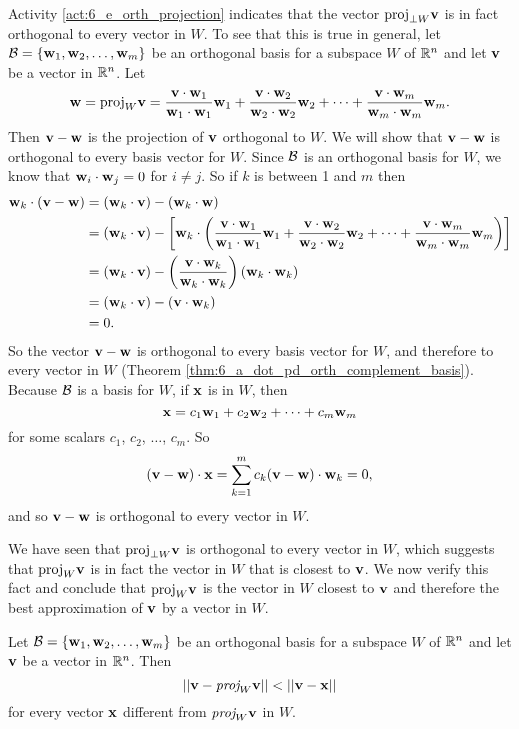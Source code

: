 Activity \ref{act:6_e_orth_projection} indicates that the vector $\text{proj}_{\perp W} \mathbf{v}$ is in fact orthogonal to every vector in $W$. To see that this is true in general, let $\mathcal{B} = \{\mathbf{w}_1, \mathbf{w}_2, \ldots, \mathbf{w}_m\}$ be an orthogonal basis for a subspace $W$ of $\mathbb{R}^n$ and let $\mathbf{v}$ be a vector in $\mathbb{R}^n$. Let 
\[\mathbf{w} =  \text{proj}_W \mathbf{v} = \frac{\mathbf{v} \cdot \mathbf{w}_1}{\mathbf{w}_1 \cdot \mathbf{w}_1} \mathbf{w}_1 + \frac{\mathbf{v} \cdot \mathbf{w}_2}{\mathbf{w}_2 \cdot \mathbf{w}_2}  \mathbf{w}_2 + \cdots + \frac{\mathbf{v} \cdot \mathbf{w}_m}{\mathbf{w}_m \cdot \mathbf{w}_m}  \mathbf{w}_m.\]
Then $\mathbf{v} - \mathbf{w}$ is the projection of $\mathbf{v}$ orthogonal to $W$. We will show that $\mathbf{v} - \mathbf{w}$ is orthogonal to every basis vector for $W$. Since $\mathcal{B}$ is an orthogonal basis for $W$, we know that $\mathbf{w}_i \cdot \mathbf{w}_j = 0$ for $i \neq j$. So if $k$ is between 1 and $m$ then
\begin{align*}
\mathbf{w}_k \cdot (\mathbf{v} - \mathbf{w}) &= (\mathbf{w}_k \cdot \mathbf{v}) - (\mathbf{w}_k \cdot \mathbf{w}) \\
	&= (\mathbf{w}_k \cdot \mathbf{v}) - \left[\mathbf{w}_k \cdot \left(\displaystyle \frac{\mathbf{v} \cdot \mathbf{w}_1}{\mathbf{w}_1 \cdot \mathbf{w}_1} \mathbf{w}_1 + \frac{\mathbf{v} \cdot \mathbf{w}_2}{\mathbf{w}_2 \cdot \mathbf{w}_2}  \mathbf{w}_2 + \cdots + \frac{\mathbf{v} \cdot \mathbf{w}_m}{\mathbf{w}_m \cdot \mathbf{w}_m}  \mathbf{w}_m \right)\right] \\
	&= (\mathbf{w}_k \cdot \mathbf{v}) - \left(\frac{\mathbf{v} \cdot \mathbf{w}_k}{\mathbf{w}_k \cdot \mathbf{w}_k}\right) (\mathbf{w}_k \cdot \mathbf{w}_k) \\
	&= (\mathbf{w}_k \cdot \mathbf{v}) - (\mathbf{v} \cdot \mathbf{w}_k) \\
	&= 0.
\end{align*}
So the vector $\mathbf{v} - \mathbf{w}$ is orthogonal to every basis vector for $W$, and therefore to every vector in $W$ (Theorem \ref{thm:6_a_dot_pd_orth_complement_basis}).  Because $\mathcal{B}$ is a basis for $W$, if $\mathbf{x}$ is in $W$, then 
\[\mathbf{x} = c_1 \mathbf{w}_1 + c_2 \mathbf{w}_2 + \cdots + c_m \mathbf{w}_m\]
for some scalars $c_1$, $c_2$, $\ldots$, $c_m$. So 
\[(\mathbf{v} - \mathbf{w}) \cdot \mathbf{x} = \sum_{k=1}^m c_k (\mathbf{v} - \mathbf{w}) \cdot \mathbf{w}_k = 0,\]
and so $\mathbf{v} - \mathbf{w}$ is orthogonal to every vector in $W$. 


We have seen that $\text{proj}_{\perp W} \mathbf{v}$ is orthogonal to every vector in $W$, which suggests that $\text{proj}_W \mathbf{v}$ is in fact the vector in $W$ that is closest to $\mathbf{v}$. We now verify this fact and conclude that $\text{proj}_W \mathbf{v}$ is the vector in $W$ closest to $\mathbf{v}$ and therefore the best approximation of $\mathbf{v}$ by a vector in $W$.

\begin{theorem} Let $\mathcal{B} = \{\mathbf{w}_1, \mathbf{w}_2, \ldots, \mathbf{w}_m\}$ be an orthogonal basis for a subspace $W$ of $\mathbb{R}^n$ and let $\mathbf{v}$ be a vector in $\mathbb{R}^n$. Then
\[||\mathbf{v} - \emph{proj}_W \mathbf{v} || < || \mathbf{v} - \mathbf{x} ||\]
for every vector $\mathbf{x}$ different from $\emph{proj}_W \mathbf{v}$ in $W$.
\end{theorem}

